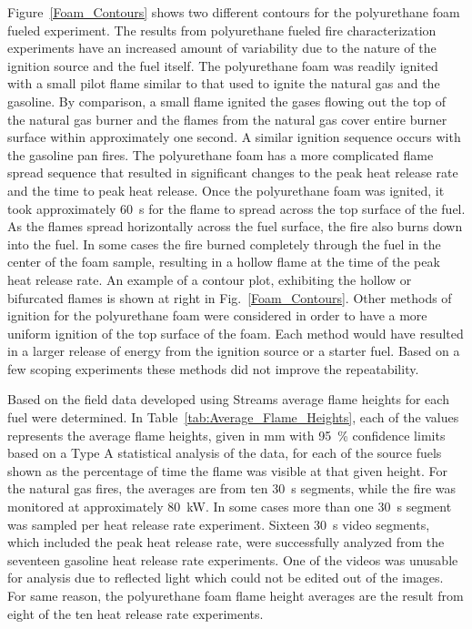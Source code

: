 \documentclass[twoside]{uocthesis}
\begin{document}
{Figure~\ref{Foam_Contours} shows two different contours for the polyurethane foam fueled experiment.  The results from polyurethane fueled fire characterization experiments have an increased amount of variability due to the nature of the ignition source and the fuel itself.  The polyurethane foam was readily ignited with a small pilot flame similar to that used to ignite the natural gas and the gasoline.  By comparison, a small flame ignited the gases flowing out the top of the natural gas burner and the flames from the natural gas cover entire burner surface within approximately one second.  A similar ignition sequence occurs with the gasoline pan fires. The polyurethane foam has a more complicated flame spread sequence that resulted in significant changes to the peak heat release rate and the time to peak heat release.  Once the polyurethane foam was ignited, it took approximately 60~s for the flame to spread across the top surface of the fuel.  As the flames spread horizontally across the fuel surface, the fire also burns down into the fuel.  In some cases the fire burned completely through the fuel in the center of the foam sample, resulting in a hollow flame at the time of the peak heat release rate.  An example of a contour plot, exhibiting the hollow or bifurcated flames is shown at right in Fig.~\ref{Foam_Contours}.  Other methods of ignition for the polyurethane foam were considered in order to have a more uniform ignition of the top surface of the foam.  Each method would have resulted in a larger release of energy from the ignition source or a starter fuel.   Based on a few scoping experiments these methods did not improve the repeatability.

Based on the field data developed using Streams average flame heights for each fuel were determined.  In Table~\ref{tab:Average_Flame_Heights}, each of the values represents the average flame heights, given in mm with 95~\% confidence limits based on a Type A statistical analysis of the data, for each of the source fuels shown as the percentage of time the flame was visible at that given height.  For the natural gas fires, the averages are from ten 30~s segments, while the fire was monitored at approximately 80~kW.  In some cases more than one 30~s segment was sampled per heat release rate experiment.  Sixteen 30~s video segments, which included the peak heat release rate, were successfully analyzed from the seventeen gasoline heat release rate experiments.  One of the videos was unusable for analysis due to reflected light which could not be edited out of the images.  For same reason, the polyurethane foam flame height averages are the result from eight of the ten heat release rate experiments.

}
\end{document}
